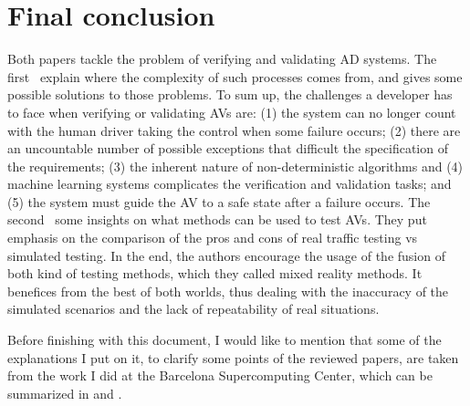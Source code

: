 \documentclass[a4paper, 10pt]{article}
\begin{document}
\section{Final conclusion}
\vspace{-1mm}
Both papers tackle the problem of verifying and validating AD systems. The first~\cite{challenges} explain where the complexity of such processes comes from, and gives some possible solutions to those problems. To sum up, the challenges a developer has to face when verifying or validating AVs are: (1) the system can no longer count with the human driver taking the control when some failure occurs; (2) there are an uncountable number of possible exceptions that difficult the specification of the requirements; (3) the inherent nature of non-deterministic algorithms and (4) machine learning systems complicates the verification and validation tasks; and (5) the system must guide the AV to a safe state after a failure occurs. The second~\cite{methods} some insights on what methods can be used to test AVs. They put emphasis on the comparison of the pros and cons of real traffic testing vs simulated testing. In the end, the authors encourage the usage of the fusion of both kind of testing methods, which they called mixed reality methods. It benefices from the best of both worlds, thus dealing with the inaccuracy of the simulated scenarios and the lack of repeatability of real situations.

Before finishing with this document, I would like to mention that some of the explanations I put on it, to clarify some points of the reviewed papers, are taken from the work I did at the Barcelona Supercomputing Center, which can be summarized in \cite{En-Route:SAC2020} and \cite{TimingApollo:RTAS2020}.

\vspace{-1mm}


\end{document}
